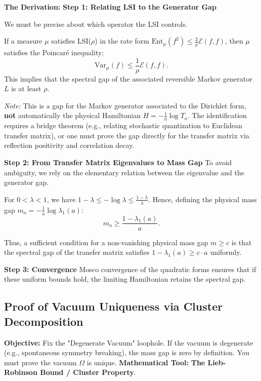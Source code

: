 \textbf{The Derivation:}
\textbf{Step 1: Relating LSI to the Generator Gap}

We must be precise about which operator the LSI controls.
\begin{lemma}
If a measure $\mu$ satisfies LSI($\rho$) in the rate form $\mathrm{Ent}_\mu(f^2) \le \frac{2}{\rho}\mathcal{E}(f,f)$, then $\mu$ satisfies the Poincaré inequality:
\begin{equation}
\mathrm{Var}_\mu(f) \le \frac{1}{\rho}\mathcal{E}(f,f).
\end{equation}
This implies that the spectral gap of the associated reversible Markov generator $L$ is at least $\rho$.
\end{lemma}
\emph{Note:} This is a gap for the Markov generator associated to the Dirichlet form, \textbf{not} automatically the physical Hamiltonian $H = -\frac{1}{a}\log T_a$. The identification requires a bridge theorem (e.g., relating stochastic quantization to Euclidean transfer matrix), or one must prove the gap directly for the transfer matrix via reflection positivity and correlation decay.

\textbf{Step 2: From Transfer Matrix Eigenvalues to Mass Gap}
To avoid ambiguity, we rely on the elementary relation between the eigenvalue and the generator gap.

\begin{lemma}
For $0 < \lambda < 1$, we have $1 - \lambda \le -\log \lambda \le \frac{1-\lambda}{\lambda}$.
Hence, defining the physical mass gap $m_a = -\frac{1}{a}\log \lambda_1(a)$:
\begin{equation}
m_a \ge \frac{1-\lambda_1(a)}{a}.
\end{equation}
\end{lemma}
Thus, a sufficient condition for a non-vanishing physical mass gap $m \ge c$ is that the spectral gap of the transfer matrix satisfies $1 - \lambda_1(a) \ge c \cdot a$ uniformly.

\textbf{Step 3: Convergence}
Mosco convergence of the quadratic forms ensures that if these uniform bounds hold, the limiting Hamiltonian retains the spectral gap.

\subsection{Proof of Vacuum Uniqueness via Cluster Decomposition}
\textbf{Objective:} Fix the "Degenerate Vacuum" loophole. If the vacuum is degenerate (e.g., spontaneous symmetry breaking), the mass gap is zero by definition. You must prove the vacuum $\Omega$ is unique.
\textbf{Mathematical Tool:} \textbf{The Lieb-Robinson Bound / Cluster Property}.

